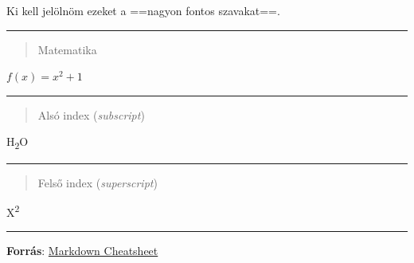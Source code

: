 \documentclass[
]{article}
\begin{document}
Ki kell jelölnöm ezeket a ==nagyon fontos szavakat==.

\begin{center}\rule{0.5\linewidth}{0.5pt}\end{center}

\begin{quote}
Matematika
\end{quote}

\(f(x)=x^2+1\)

\begin{center}\rule{0.5\linewidth}{0.5pt}\end{center}

\begin{quote}
Alsó index (\emph{subscript})
\end{quote}

H\textsubscript{2}O

\begin{center}\rule{0.5\linewidth}{0.5pt}\end{center}

\begin{quote}
Felső index (\emph{superscript})
\end{quote}

X\textsuperscript{2}

\begin{center}\rule{0.5\linewidth}{0.5pt}\end{center}

\textbf{Forrás}:
\href{https://www.markdownguide.org/cheat-sheet/}{Markdown Cheatsheet}
\end{document}
